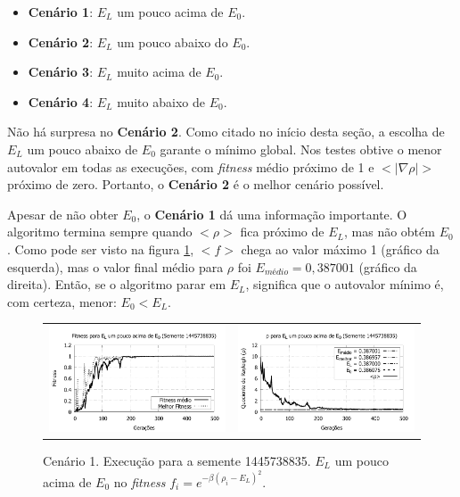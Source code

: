	\begin{itemize}
	
		\item \textbf{Cenário 1}: $E_L$ um pouco acima de $E_0$.
			
		\item \textbf{Cenário 2}: $E_L$ um pouco abaixo do $E_0$.
		
		\item \textbf{Cenário 3}: $E_L$ muito acima de $E_0$.
		
		\item \textbf{Cenário 4}: $E_L$ muito abaixo de $E_0$.
	\end{itemize}
	
	
	Não há surpresa no \textbf{Cenário 2}. Como citado no início desta seção, a escolha de $E_L$ um pouco abaixo de $E_0$ garante o mínimo global. Nos testes obtive o menor autovalor em todas as execuções, com \emph{fitness} médio próximo de 1 e $<|\nabla \rho|>$ próximo de zero. Portanto, o \textbf{Cenário 2} é o melhor cenário possível.	
	
	Apesar de não obter $E_0$, o \textbf{Cenário 1} dá uma informação importante. O algoritmo termina sempre quando $<\rho>$ fica próximo de $E_L$, mas não obtém $E_0$. Como pode ser visto na figura \ref{fig:execucoesSemente_EL_umPoucoAcima}, $<f>$ chega ao valor máximo 1 (gráfico da esquerda), mas o valor final médio para $\rho$ foi $E_{médio} = 0,387001$ (gráfico da direita). Então, se o algoritmo parar em $E_L$, significa que o autovalor mínimo é, com certeza, menor: $E_0 < E_L$. 
	
	\begin{figure}[htbp]
	\centering
  \begin{tabular}{@{}cc@{}}
	
		\includegraphics[width=.45\textwidth]{figs/resultados/variandoELSemente/T1_S-1445738835_fitness.pdf} &
    \includegraphics[width=.45\textwidth]{figs/resultados/variandoELSemente/T1_S-1445738835_rho.pdf}
  \end{tabular}
  \caption{Cenário 1. Execução para a semente 1445738835. $E_L$ um pouco acima de $E_0$ no \textit{fitness} $f_i = e^{-\beta(\rho_i - E_L)^2}$.}
	\label{fig:execucoesSemente_EL_umPoucoAcima}
	\end{figure}
	
